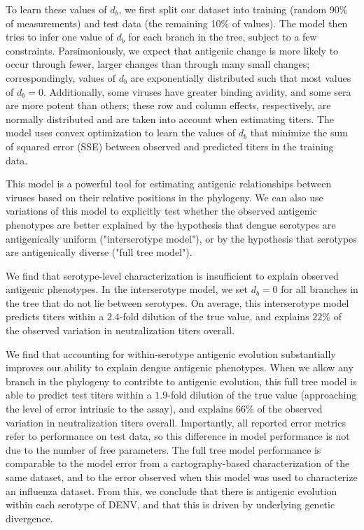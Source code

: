\documentclass[11pt,oneside,letterpaper]{article}
\begin{document}
To learn these values of $d_b$, we first split our dataset into training (random 90\% of measurements) and test data (the remaining 10\% of values).
The model then tries to infer one value of $d_b$ for each branch in the tree, subject to a few constraints.
Parsimoniously, we expect that antigenic change is more likely to occur through fewer, larger changes than through many small changes; correspondingly, values of $d_b$ are exponentially distributed such that most values of $d_b = 0$.
Additionally, some viruses have greater binding avidity, and some sera are more potent than others; these row and column effects, respectively, are normally distributed and are taken into account when estimating titers.
The model uses convex optimization to learn the values of $d_b$ that minimize the sum of squared error (SSE) between observed and predicted titers in the training data.

This model is a powerful tool for estimating antigenic relationships between viruses based on their relative positions in the phylogeny.
We can also use variations of this model to explicitly test whether the observed antigenic phenotypes are better explained by the hypothesis that dengue serotypes are antigenically uniform ("interserotype model"), or by the hypothesis that serotypes are antigenically diverse ("full tree model").

We find that serotype-level characterization is insufficient to explain observed antigenic phenotypes.
In the interserotype model, we set $d_b = 0$ for all branches in the tree that do not lie between serotypes.
On average, this interserotype model predicts titers within a $2.4$-fold dilution of the true value, and explains $22\%$ of the observed variation in neutralization titers overall.

We find that accounting for within-serotype antigenic evolution substantially improves our ability to explain dengue antigenic phenotypes.
When we allow any branch in the phylogeny to contribte to antigenic evolution, this full tree model is able to predict test titers within a $1.9$-fold dilution of the true value (approaching the level of error intrinsic to the assay), and explains $66\%$ of the observed variation in neutralization titers overall.
Importantly, all reported error metrics refer to performance on test data, so this difference in model performance is not due to the number of free parameters.
The full tree model performance is comparable to the model error from a cartography-based characterization of the same dataset, and to the error observed when this model was used to characterize an influenza dataset.
From this, we conclude that there is antigenic evolution within each serotype of DENV, and that this is driven by underlying genetic divergence.
\end{document}
